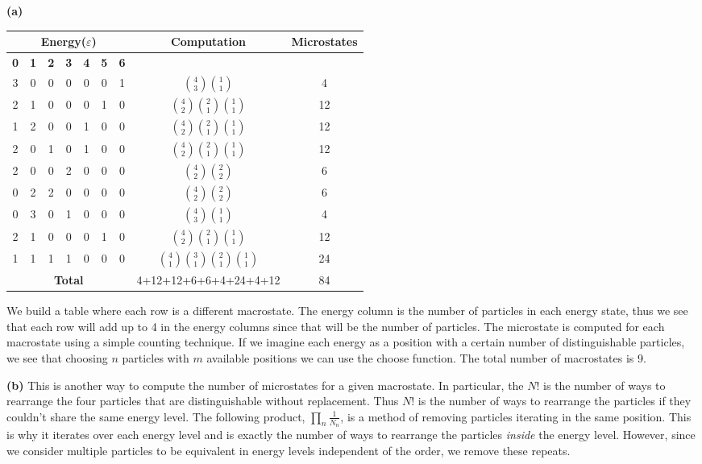 \documentclass[10pt]{article}
\begin{document}
\textbf{(a)}
\begin{center}
\begin{tabular}{|c|c|c|c|c|c|c|c|c|}
 \hline
 \multicolumn{7}{|c|}{\textbf{Energy($\varepsilon$)}} & \textbf{Computation} & \textbf{Microstates}\\
 \hline
 \textbf{0} & \textbf{1} & \textbf{2} & \textbf{3} & \textbf{4} & \textbf{5} & \textbf{6}& &\\
  \hline
  3 & 0 & 0 & 0 & 0 & 0 & 1 & ${{4}\choose{3}}{{1}\choose{1}}$ &4\\
  \hline
  2 & 1 & 0 & 0 & 0 & 1 & 0 & ${{4}\choose{2}}{{2}\choose{1}}{{1}\choose{1}}$ &12\\
  \hline
  1 & 2 & 0 & 0 & 1 & 0 & 0 & ${{4}\choose{2}}{{2}\choose{1}}{{1}\choose{1}}$ &12\\
  \hline
  2 & 0 & 1 & 0 & 1 & 0 & 0 & ${{4}\choose{2}}{{2}\choose{1}}{{1}\choose{1}}$ &12\\
  \hline
  2 & 0 & 0 & 2 & 0 & 0 & 0 & ${{4}\choose{2}}{{2}\choose{2}}$ &6\\
  \hline
  0 & 2 & 2 & 0 & 0 & 0 & 0 & ${{4}\choose{2}}{{2}\choose{2}}$ &6\\
  \hline
  0 & 3 & 0 & 1 & 0 & 0 & 0 & ${{4}\choose{3}}{{1}\choose{1}}$ &4\\
  \hline
  2 & 1 & 0 & 0 & 0 & 1 & 0 & ${{4}\choose{2}}{{2}\choose{1}}{{1}\choose{1}}$ &12\\
  \hline
  1 & 1 & 1 & 1 & 0 & 0 & 0 & ${4\choose 1}{3\choose 1}{2\choose 1}{1\choose 1}$ &24\\
  \hline
  \multicolumn{7}{|c|}{\textbf{Total}} & 4+12+12+6+6+4+24+4+12 & 84 \\
  \hline
\end{tabular}
\end{center}
We build a table where each row is a different macrostate. The energy column is the number of particles in each energy state, thus we see that each row will add up to 4 in the energy columns since that will be the number of particles. The microstate is computed for each macrostate using a simple counting technique. If we imagine each energy as a position with a certain number of distinguishable particles, we see that choosing $n$ particles with $m$ available positions we can use the choose function. The total number of macrostates is 9.

\textbf{(b)}
This is another way to compute the number of microstates for a given macrostate. In particular, the $N!$ is the number of ways to rearrange the four particles that are distinguishable without replacement. Thus $N!$ is the number of ways to rearrange the particles if they couldn't share the same energy level. The following product, $\prod_{n}\frac{1}{N_{n}}$, is a method of removing particles iterating in the same position. This is why it iterates over each energy level and is exactly the number of ways to rearrange the particles \textit{inside} the energy level. However, since we consider multiple particles to be equivalent in energy levels independent of the order, we remove these repeats.
\end{document}
